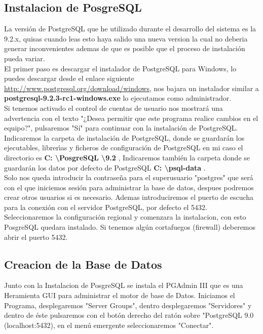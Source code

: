 \subsection{Instalacion de PosgreSQL}

La versión de PostgreSQL que he utilizado durante el desarrollo del sistema es
la 9.2.x, quisas cuando leas esto haya salido una nueva version la cual no deberia
generar inconvenientes ademas de que es posible que el proceso de instalación
pueda variar.\\[0.2cm]
 
El primer paso es descargar el instalador de PostgreSQL para Windows,
lo puedes descargar desde el enlace siguiente
\url{http://www.postgresql.org/download/windows}, nos bajara un instalador similar
a {\bfseries postgresql-9.2.3-rc1-windows.exe} lo ejecutamos como administrador.\\[0.2cm]

Si tenemos activado el control de cuentas de usuario nos mostrar\'a una advertencia
con el texto "¿Desea permitir que este programa realice cambios en el equipo?",
pulsaremos "Sí" para continuar con la instalación de PostgreSQL.\\[0.2cm]

Indicaremos la carpeta de instalaci\'on de PostgreSQL, donde se guardarán los
ejecutables, librer\'{\i}as y ficheros de configuraci\'on de PostgreSQL en mi caso el
directorio es {\bfseries C: \textbackslash PosgreSQL \textbackslash 9.2 },
Indicaremos tambi\'en la carpeta donde se guardarán los datos por defecto
de PostgreSQL {\bfseries C: \textbackslash psql-data }.\\[0.2cm]

Solo nos queda introducir la contraseña para el superusuario "postgres" que
será con el que iniciemos sesión para administrar la base de datos, despues
podremos crear otros usuarios si es necesario. Ademas introduciremos el puerto
de escucha para la conexión con el servidor PostgreSQL, por defecto el 5432.\\[0.2cm]

Seleccionaremos la configuración regional y comenzara la instalacion, con esto
PosgreSQL quedara instalado. Si tenemos algún cortafuegos (firewall) deberemos
abrir el puerto 5432.

\subsection{Creacion de la Base de Datos}

Junto con la Instalacion de PosgreSQL se instala el PGAdmin III que es una Heramienta
GUI para administrar el motor de base de Datos. Iniciamos el Programa,
desplegaremos "Server Groups", dentro desplegaremos "Servidores" y dentro de
éste pulsaremos con el botón derecho del ratón sobre "PostgreSQL 9.0 (localhost:5432),
en el menú emergente seleccionaremos "Conectar".


